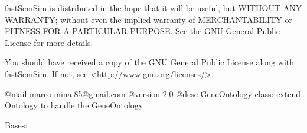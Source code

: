 \documentclass[letterpaper,10pt,english]{sphinxmanual}
\begin{document}
fastSemSim is distributed in the hope that it will be useful,
but WITHOUT ANY WARRANTY; without even the implied warranty of
MERCHANTABILITY or FITNESS FOR A PARTICULAR PURPOSE.  See the
GNU General Public License for more details.

You should have received a copy of the GNU General Public License
along with fastSemSim.  If not, see \textless{}\href{http://www.gnu.org/licenses/}{http://www.gnu.org/licenses/}\textgreater{}.

@mail \href{mailto:marco.mina.85@gmail.com}{marco.mina.85@gmail.com}
@version 2.0
@desc GeneOntology class: extend Ontology to handle the GeneOntology

\begin{fulllineitems}
\label{fastsemsim.Ontology:fastsemsim.Ontology.FFOntology.FFOntology}
Bases: {\hyperref[fastsemsim.Ontology:fastsemsim.Ontology.Ontology.Ontology]{}}

\begin{fulllineitems}
\label{fastsemsim.Ontology:fastsemsim.Ontology.FFOntology.FFOntology.alt_ids}
\end{fulllineitems}


\begin{fulllineitems}
\label{fastsemsim.Ontology:fastsemsim.Ontology.FFOntology.FFOntology.id2name}
\end{fulllineitems}


\begin{fulllineitems}
\label{fastsemsim.Ontology:fastsemsim.Ontology.FFOntology.FFOntology.name2id}
\end{fulllineitems}


\begin{fulllineitems}
\label{fastsemsim.Ontology:fastsemsim.Ontology.FFOntology.FFOntology.obsolete_ids}
\end{fulllineitems}


\end{fulllineitems}
\end{document}
